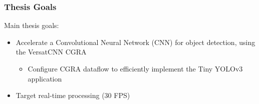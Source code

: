 \begin{frame}
  \frametitle{Thesis Goals}
  Main thesis goals:
  \begin{itemize}
  \item Accelerate a Convolutional Neural Network (CNN) for object detection,
    using the VersatCNN CGRA 
    \begin{itemize}
    \item Configure CGRA dataflow to efficiently implement the Tiny YOLOv3
      application
    \end{itemize}
  \item Target real-time processing (30 FPS)
  \end{itemize}
\end{frame}



